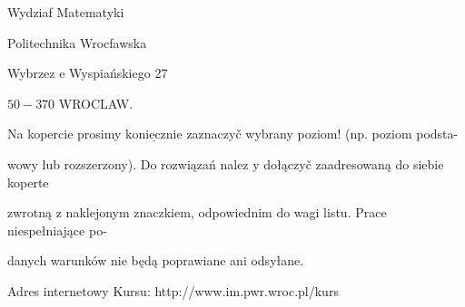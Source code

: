 \documentclass[a4paper,12pt]{article}
\begin{document}
Wydziaf Matematyki

Politechnika Wrocfawska

Wybrzez $\mathrm{e}$ Wyspiańskiego 27

$50-370$ WROCLAW.

Na kopercie prosimy $\underline{\mathrm{k}\mathrm{o}\mathrm{n}\mathrm{i}\mathrm{e}\mathrm{c}\mathrm{z}\mathrm{n}\mathrm{i}\mathrm{e}}$ zaznaczyč wybrany poziom! (np. poziom podsta-

wowy lub rozszerzony). Do rozwiązań nalez $\mathrm{y}$ dołączyč zaadresowaną do siebie koperte

zwrotną $\mathrm{z}$ naklejonym znaczkiem, odpowiednim do wagi listu. Prace niespełniające po-

danych warunków nie będą poprawiane ani odsyłane.

Adres internetowy Kursu: http://www.im.pwr.wroc.pl/kurs
\end{document}
